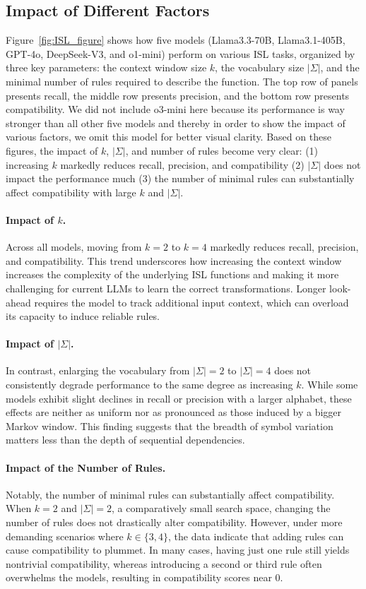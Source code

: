 \subsection{Impact of Different Factors}
Figure~\ref{fig:ISL_figure} shows how five models (Llama3.3-70B, Llama3.1-405B, GPT-4o, DeepSeek-V3, and o1-mini) perform on various ISL tasks, organized by three key parameters: the context window size $k$, the vocabulary size $|\Sigma|$, and the minimal number of rules required to describe the function. The top row of panels presents recall, the middle row presents precision, and the bottom row presents compatibility. We did not include o3-mini here because its performance is way stronger than all other five models and thereby in order to show the impact of various factors, we omit this model for better visual clarity. Based on these figures, the impact of $k$, $|\Sigma|$, and number of rules become very clear: (1) increasing $k$ markedly reduces recall, precision, and compatibility (2) $|\Sigma|$ does not impact the performance much (3) the number of minimal rules can substantially affect compatibility with large $k$ and $|\Sigma|$. 

\paragraph{Impact of $k$.} Across all models, moving from $k=2$ to $k=4$ markedly reduces recall, precision, and compatibility. This trend underscores how increasing the context window increases the complexity of the underlying ISL functions and making it more challenging for current LLMs to learn the correct transformations. Longer look-ahead requires the model to track additional input context, which can overload its capacity to induce reliable rules.

\paragraph{Impact of $|\Sigma|$.} In contrast, enlarging the vocabulary from $|\Sigma| = 2$ to $|\Sigma| = 4$ does not consistently degrade performance to the same degree as increasing $k$. While some models exhibit slight declines in recall or precision with a larger alphabet, these effects are neither as uniform nor as pronounced as those induced by a bigger Markov window. This finding suggests that the breadth of symbol variation matters less than the depth of sequential dependencies.


\paragraph{Impact of the Number of Rules.} Notably, the number of minimal rules can substantially affect compatibility. When $k=2$ and $|\Sigma| = 2$, a comparatively small search space, changing the number of rules does not drastically alter compatibility. However, under more demanding scenarios where $k\in\{3, 4\}$, the data indicate that adding rules can cause compatibility to plummet. In many cases, having just one rule still yields nontrivial compatibility, whereas introducing a second or third rule often overwhelms the models, resulting in compatibility scores near 0. 

